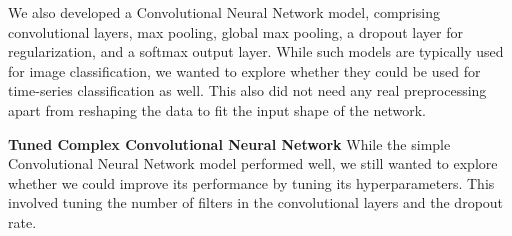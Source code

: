 We also developed a Convolutional Neural Network model, comprising convolutional layers, max pooling, global max pooling, a dropout layer for regularization, and a softmax output layer.
While such models are typically used for image classification, we wanted to explore whether they could be used for time-series classification as well.
This also did not need any real preprocessing apart from reshaping the data to fit the input shape of the network.

\textbf{Tuned Complex Convolutional Neural Network}
While the simple Convolutional Neural Network model performed well, we still wanted to explore whether we could improve its performance by tuning its hyperparameters.
This involved tuning the number of filters in the convolutional layers and the dropout rate.




